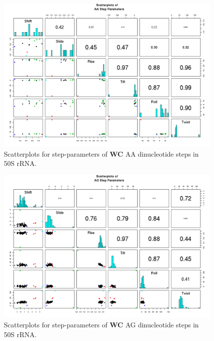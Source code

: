 \begin{figure}[H]
\centering
\includegraphics[angle=90, scale=0.6]{WC/AA.png}
\caption{Scatterplots for step-parameters of \textbf{WC} AA dinucleotide steps
in 50S rRNA.}
\label{fig:stepsAA}
\end{figure}

\begin{figure}[H]
\centering
\includegraphics[angle=90, scale=0.6]{WC/AG.png}
\caption{Scatterplots for step-parameters of \textbf{WC} AG dinucleotide steps
in 50S rRNA.}
\label{fig:stepsAG}
\end{figure}

